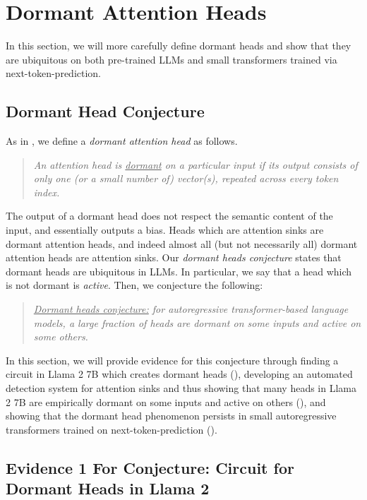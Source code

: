 \section{Dormant Attention Heads}\label{sec:dormant_heads}
 
 In this section, we will more carefully define dormant heads and show that they are ubiquitous on both pre-trained LLMs and small transformers trained via next-token-prediction.

\subsection{Dormant Head Conjecture} \label{sub:dormant_head_conjecture}

As in , we define a \textit{dormant attention head} as follows.
\begin{quote}
    \textit{An attention head is \underline{dormant} on a particular input if its output consists of only one (or a small number of) vector(s), repeated across every token index.}
\end{quote}
 The output of a dormant head does not respect the semantic content of the input, and essentially outputs a bias. Heads which are attention sinks are dormant attention heads, and indeed almost all (but not necessarily all) dormant attention heads are attention sinks. Our \textit{dormant heads conjecture} states that dormant heads are ubiquitous in LLMs. In particular, we say that a head which is not dormant is \textit{active}. Then, we conjecture the following:
 \begin{quote}
     \textit{\underline{Dormant heads conjecture:} for autoregressive transformer-based language models, a large fraction of heads are dormant on some inputs and active on some others.}
 \end{quote}
 In this section, we will provide evidence for this conjecture through finding a circuit in Llama 2 7B which creates dormant heads (), developing an automated detection system for attention sinks and thus showing that many heads in Llama 2 7B are empirically dormant on some inputs and active on others (), and showing that the dormant head phenomenon persists in small autoregressive transformers trained on next-token-prediction ().


\subsection{Evidence 1 For Conjecture: Circuit for Dormant Heads in Llama 2} \label{sub:circuit_evidence}

